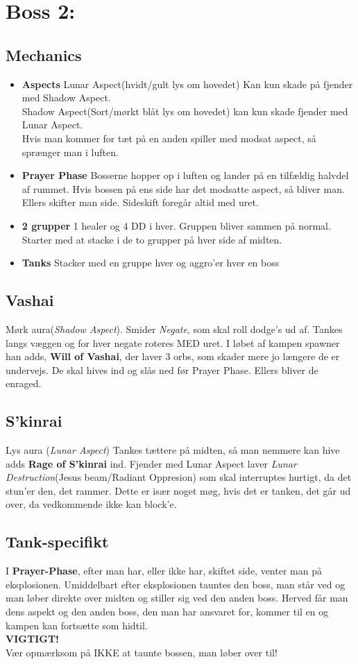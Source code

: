 \documentclass[12pt,a4paper]{article}
\begin{document}
\section*{Boss 2:}
\subsection*{Mechanics}
\begin{itemize}
  \item \textbf{Aspects} Lunar Aspect(hvidt/gult lys om hovedet) Kan kun skade
    på fjender med Shadow Aspect.\\
    Shadow Aspect(Sort/mørkt blåt lys om hovedet) kan kun skade fjender med
    Lunar Aspect.\\
    Hvis man kommer for tæt på en anden spiller med modsat aspect, så sprænger
    man i luften.
  \item \textbf{Prayer Phase} Bosserne hopper op i luften og lander på en
    tilfældig halvdel af rummet. Hvis bossen på ens side har det modsatte
    aspect, så bliver man. Ellers skifter man side. Sideskift foregår altid med
    uret.
  \item \textbf{2 grupper} 1 healer og 4 DD i hver. Gruppen bliver sammen på
    normal. Starter med at stacke i de to grupper på hver side af midten. 
  \item \textbf{Tanks} Stacker med en gruppe hver og aggro'er hver en boss

\end{itemize}
\subsection*{Vashai}
Mørk aura(\emph{Shadow Aspect}). Smider \emph{Negate}, som skal roll dodge's ud
af. Tankes langs væggen og for hver negate roteres MED uret. I løbet af kampen
spawner han adds, \textbf{Will of Vashai}, der laver 3 orbs, som skader mere jo
længere de er undervejs. De skal hives ind og slås ned før
Prayer Phase. Ellers bliver de enraged.
\subsection*{S'kinrai}
Lys aura (\emph{Lunar Aspect}) Tankes tættere på midten, så man nemmere kan
hive adds \textbf{Rage of S'kinrai} ind. Fjender med Lunar Aspect laver
\emph{Lunar Destruction}(Jesus beam/Radiant Oppresion) som skal interruptes
hurtigt, da det stun'er den, det rammer. Dette er især noget møg, hvis det er
tanken, det går ud over, da vedkommende ikke kan block'e.

\subsection*{Tank-specifikt}
I \textbf{Prayer-Phase}, efter man har, eller ikke har, skiftet side, venter
man på eksplosionen. Umiddelbart efter eksplosionen tauntes den boss, man står
ved og man løber direkte over midten og stiller sig ved den anden boss. Herved
får man dens aspekt og den anden boss, den man har ansvaret for, kommer til en
og kampen kan fortsætte som hidtil.\\
\textbf{VIGTIGT!}\\
Vær opmærksom på IKKE at taunte bossen, man løber over til!
\end{document}
